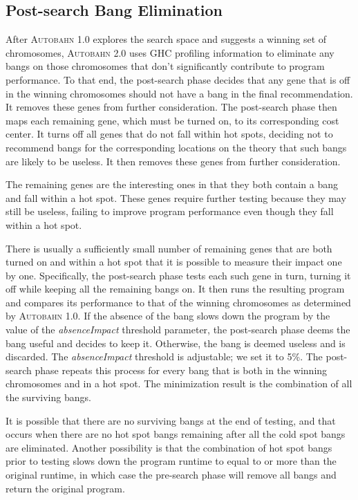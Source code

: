 \documentclass[format=sigplan, review=true, 9pt]{acmart}
\newcommand{\cut}[1]{}
\newcommand{\hotspot}[0]{hot spot}
\newcommand{\hotspots}[0]{hot spots}
\newcommand{\coldspot}[0]{cold spot}
\newcommand{\useless}[0]{useless}
\newcommand{\Ao}[0]{\textsc{Autobahn 1.0}}
\newcommand{\At}[0]{\textsc{Autobahn 2.0}}
\newcommand{\preopt}[0]{pre-search}
\newcommand{\postopt}[0]{post-search}
\newcommand{\Postopt}[0]{Post-search}
\newcommand{\absim}[0]{\textit{absenceImpact}}
\begin{document}
\subsection{\Postopt{} Bang Elimination}

After \Ao{} explores the search space and suggests a winning set of
chromosomes, \At{} uses GHC profiling information to eliminate any
bangs on those chromosomes that don't significantly contribute to
program performance. To that end, 
the \postopt{} phase decides that any gene that is off in the winning
chromosomes should not have a bang in the final recommendation.
It removes these genes from further consideration. 
The \postopt{} phase then maps each remaining gene, which must be
turned on, to its corresponding cost center.  It turns off all genes
that do not fall within \hotspots{}, deciding not to recommend bangs
for the corresponding locations on the theory that such bangs are
likely to be \useless{}.  It then removes these genes from further
consideration. 

The remaining genes are the interesting ones in that they both
contain a bang and fall within a \hotspot{}. These genes require
further testing because they may still be \useless{}, failing to
improve program performance even though they fall within a \hotspot{}.
\cut{If they are \useless{}, they should be discarded. }
There is usually a sufficiently small number of remaining genes that
are both turned on and within a \hotspot{} that it is possible to
measure their impact one by one. Specifically, 
the \postopt{} phase tests each such gene in turn, turning
it off while keeping all the remaining bangs on.  It 
then runs the resulting program and compares its performance to that
of the winning chromosomes as determined by \Ao{}.
If the absence of the bang slows down the program by the value of the \absim{}
threshold parameter, the \postopt{} phase deems the bang useful and
decides to keep it. 
Otherwise, the bang is deemed \useless{} and is
discarded. The \absim{} threshold is adjustable; we set it to
5\%. The \postopt{} phase repeats this process for every bang
that is both in the winning chromosomes and in a \hotspot{}. 
The minimization result is the combination of all the surviving
bangs.

It is possible that there are no surviving bangs at the end of testing, and that occurs when
there are no \hotspot{} bangs remaining after all the \coldspot{} bangs are eliminated. 
Another possibility is that the combination of \hotspot{} bangs prior to testing slows down 
the program runtime to equal to or more than the original runtime, in which case the \preopt{}
phase will remove all bangs and return the original program.
\end{document}
